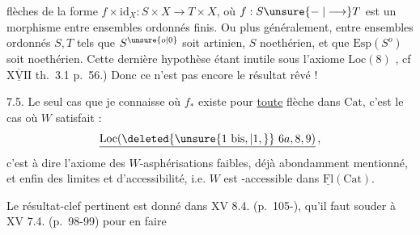 flèches de la forme $f\times\mathrm{id}_X:S\times X\longrightarrow T\times X$, où $f:S\unsure{\relbar|\longrightarrow}T$ est un morphisme entre ensembles ordonnés finis. Ou plus généralement, entre ensembles ordonnés $S,T$ tels que $S^{\unsure{o|0}}$ soit artinien,  $S$ noethérien, et que $\mathrm{Esp}(S^o)$ soit noethérien. Cette dernière hypothèse étant inutile sous l'axiome $\mathrm{Loc}(8)$ , cf $\underline{\overline{\mathrm{XVII}}}$ th.~3.1 p.~56.) Donc ce n'est pas encore le résultat rêvé !

7.5. Le seul cas que je connaisse où $f_*$ existe pour \uline{toute} flèche dans $\mathrm{Cat}$, c'est le cas où $W$ satisfait :
\[
\underline{\mathrm{Loc}(\deleted{\unsure{1\ \mathrm{bis},|1,}}\ 6a,8,9)}\,,
\]
c'est à dire  l'axiome des $W$-asphérisations faibles, déjà abondamment mentionné, et enfin  des limites et d'accessibilité, i.e. $W$ est -accessible dans $\underline{\mathrm{Fl}}(\mathrm{Cat})$.

Le résultat-clef pertinent est donné dans XV 8.4. (p.~105-), qu'il faut souder à XV 7.4. (p.~98-99) pour en faire
